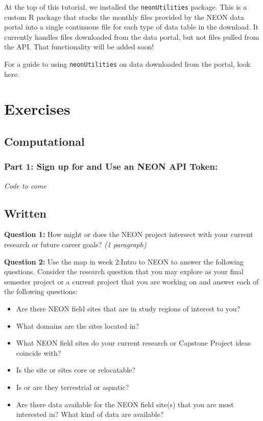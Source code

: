 \documentclass[]{book}
\providecommand{\tightlist}{%
  \setlength{\itemsep}{0pt}\setlength{\parskip}{0pt}}
\begin{document}
At the top of this tutorial, we installed the \texttt{neonUtilities} package.
This is a custom R package that stacks the monthly files provided by
the NEON data portal into a single continuous file for each type of
data table in the download. It currently handles files downloaded from
the data portal, but not files pulled from the API. That functionality
will be added soon!

For a guide to using \texttt{neonUtilities} on data downloaded from the portal,
look here.

\hypertarget{exercises}{%
\section{Exercises}\label{exercises}}

\hypertarget{computational}{%
\subsection{Computational}\label{computational}}

\hypertarget{part-1-sign-up-for-and-use-an-neon-api-token}{%
\subsubsection{Part 1: Sign up for and Use an NEON API Token:}\label{part-1-sign-up-for-and-use-an-neon-api-token}}

\emph{Code to come}

\hypertarget{written}{%
\subsection{Written}\label{written}}

\textbf{Question 1:} How might or does the NEON project
intersect with your current research or future career goals? \emph{(1 paragraph)}

\leavevmode\hypertarget{ds-challenge}{}%
\textbf{Question 2:}
Use the map in week 2:Intro to NEON to answer the following questions. Consider the research question that you may explore as your final semester project or a current project that you are working on and answer each of the following questions:

\begin{itemize}
\tightlist
\item
  Are there NEON field sites that are in study regions of interest to you?\\
\item
  What domains are the sites located in?\\
\item
  What NEON field sites do your current research or Capstone Project ideas
  coincide with?\\
\item
  Is the site or sites core or relocatable?\\
\item
  Is or are they terrestrial or aquatic?\\
\item
  Are there data available for the NEON field site(s) that you are most
  interested in? What kind of data are available?
\end{itemize}
\end{document}

